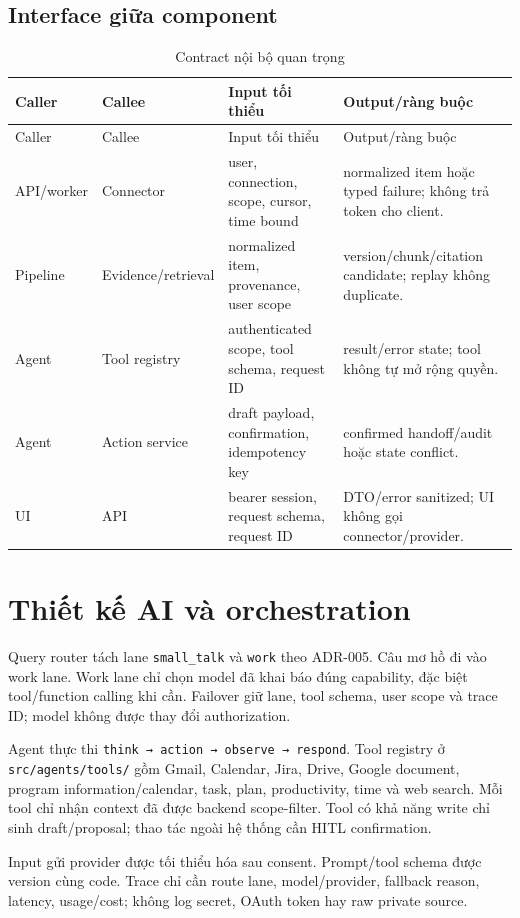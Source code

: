 \documentclass[12pt,a4paper]{article}
\begin{document}
\subsection{Interface giữa component}
\begin{longtable}{p{3.2cm}p{3.8cm}p{4.2cm}p{3.1cm}}
\caption{Contract nội bộ quan trọng}\label{tab:sdd-internal-contract}\\
\toprule Caller & Callee & Input tối thiểu & Output/ràng buộc \\ \midrule
\endfirsthead
\toprule Caller & Callee & Input tối thiểu & Output/ràng buộc \\ \midrule
\endhead
API/worker & Connector & user, connection, scope, cursor, time bound & normalized item hoặc typed failure; không trả token cho client. \\
Pipeline & Evidence/retrieval & normalized item, provenance, user scope & version/chunk/citation candidate; replay không duplicate. \\
Agent & Tool registry & authenticated scope, tool schema, request ID & result/error state; tool không tự mở rộng quyền. \\
Agent & Action service & draft payload, confirmation, idempotency key & confirmed handoff/audit hoặc state conflict. \\
UI & API & bearer session, request schema, request ID & DTO/error sanitized; UI không gọi connector/provider. \\
\bottomrule
\end{longtable}

\section{Thiết kế AI và orchestration}
Query router tách lane \texttt{small\_talk} và \texttt{work} theo ADR-005.
Câu mơ hồ đi vào work lane. Work lane chỉ chọn model đã khai báo đúng capability,
đặc biệt tool/function calling khi cần. Failover giữ lane, tool schema, user
scope và trace ID; model không được thay đổi authorization.

Agent thực thi \texttt{think → action → observe → respond}. Tool registry ở
\texttt{src/agents/tools/} gồm Gmail, Calendar, Jira, Drive, Google document,
program information/calendar, task, plan, productivity, time và web search.
Mỗi tool chỉ nhận context đã được backend scope-filter. Tool có khả năng write
chỉ sinh draft/proposal; thao tác ngoài hệ thống cần HITL confirmation.

Input gửi provider được tối thiểu hóa sau consent. Prompt/tool schema được
version cùng code. Trace chỉ cần route lane, model/provider, fallback reason,
latency, usage/cost; không log secret, OAuth token hay raw private source.
\end{document}
